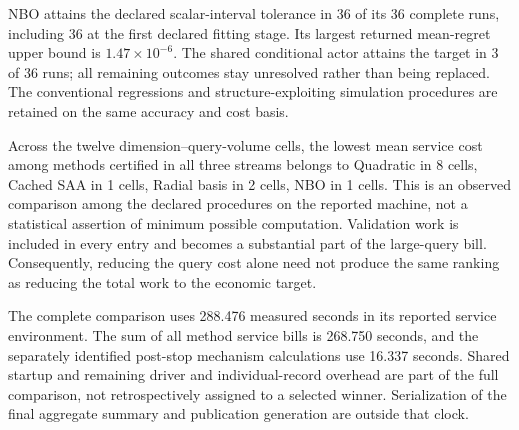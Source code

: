 NBO attains the declared scalar-interval tolerance in 36 of its 36 complete runs, including 36 at the first declared fitting stage. Its largest returned mean-regret upper bound is $1.47\times10^{-6}$. The shared conditional actor attains the target in 3 of 36 runs; all remaining outcomes stay unresolved rather than being replaced. The conventional regressions and structure-exploiting simulation procedures are retained on the same accuracy and cost basis.

Across the twelve dimension--query-volume cells, the lowest mean service cost among methods certified in all three streams belongs to Quadratic in 8 cells, Cached SAA in 1 cells, Radial basis in 2 cells, NBO in 1 cells. This is an observed comparison among the declared procedures on the reported machine, not a statistical assertion of minimum possible computation. Validation work is included in every entry and becomes a substantial part of the large-query bill. Consequently, reducing the query cost alone need not produce the same ranking as reducing the total work to the economic target.

The complete comparison uses 288.476 measured seconds in its reported service environment. The sum of all method service bills is 268.750 seconds, and the separately identified post-stop mechanism calculations use 16.337 seconds. Shared startup and remaining driver and individual-record overhead are part of the full comparison, not retrospectively assigned to a selected winner. Serialization of the final aggregate summary and publication generation are outside that clock.

